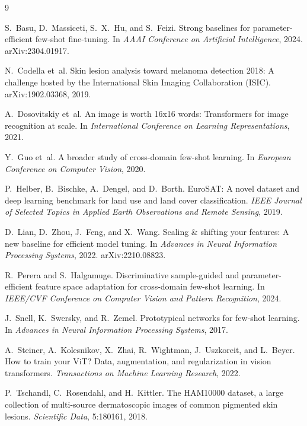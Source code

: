 \documentclass[11pt]{article}
\begin{document}
\begin{thebibliography}{9}

S.~Basu, D.~Massiceti, S.~X.~Hu, and S.~Feizi.
\newblock Strong baselines for parameter-efficient few-shot fine-tuning.
\newblock In \emph{AAAI Conference on Artificial Intelligence}, 2024.
  arXiv:2304.01917.

N.~Codella et~al.
\newblock Skin lesion analysis toward melanoma detection 2018: A challenge hosted by the
  International Skin Imaging Collaboration (ISIC).
\newblock arXiv:1902.03368, 2019.

A.~Dosovitskiy et~al.
\newblock An image is worth 16x16 words: Transformers for image recognition at scale.
\newblock In \emph{International Conference on Learning Representations}, 2021.

Y.~Guo et~al.
\newblock A broader study of cross-domain few-shot learning.
\newblock In \emph{European Conference on Computer Vision}, 2020.

P.~Helber, B.~Bischke, A.~Dengel, and D.~Borth.
\newblock EuroSAT: A novel dataset and deep learning benchmark for land use and land
  cover classification.
\newblock \emph{IEEE Journal of Selected Topics in Applied Earth Observations and Remote
  Sensing}, 2019.

D.~Lian, D.~Zhou, J.~Feng, and X.~Wang.
\newblock Scaling \& shifting your features: A new baseline for efficient model tuning.
\newblock In \emph{Advances in Neural Information Processing Systems}, 2022.
  arXiv:2210.08823.

R.~Perera and S.~Halgamuge.
\newblock Discriminative sample-guided and parameter-efficient feature space adaptation
  for cross-domain few-shot learning.
\newblock In \emph{IEEE/CVF Conference on Computer Vision and Pattern Recognition}, 2024.

J.~Snell, K.~Swersky, and R.~Zemel.
\newblock Prototypical networks for few-shot learning.
\newblock In \emph{Advances in Neural Information Processing Systems}, 2017.

A.~Steiner, A.~Kolesnikov, X.~Zhai, R.~Wightman, J.~Uszkoreit, and L.~Beyer.
\newblock How to train your ViT? Data, augmentation, and regularization in vision
  transformers.
\newblock \emph{Transactions on Machine Learning Research}, 2022.

P.~Tschandl, C.~Rosendahl, and H.~Kittler.
\newblock The HAM10000 dataset, a large collection of multi-source dermatoscopic images
  of common pigmented skin lesions.
\newblock \emph{Scientific Data}, 5:180161, 2018.

\end{thebibliography}
\end{document}
